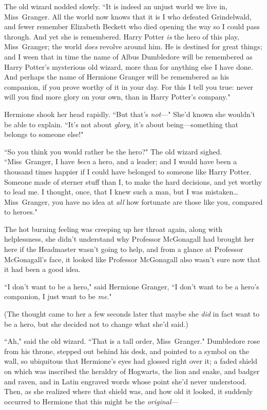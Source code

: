 The old wizard nodded slowly. ``It is indeed an unjust world we live in, Miss~Granger. All the world now knows that it is I who defeated Grindelwald, and fewer remember Elizabeth Beckett who died opening the way so I could pass through. And yet she is remembered. Harry Potter \emph{is} the hero of this play, Miss~Granger; the world \emph{does} revolve around him. He is destined for great things; and I ween that in time the name of Albus Dumbledore will be remembered as Harry Potter's mysterious old wizard, more than for anything else I have done. And perhaps the name of Hermione Granger will be remembered as his companion, if you prove worthy of it in your day. For this I tell you true: never will you find more glory on your own, than in Harry Potter's company."

Hermione shook her head rapidly. ``But that's \emph{not}—" She'd known she wouldn't be able to explain. ``It's not about \emph{glory}, it's about being—something that belongs to someone else!"

``So you think you would rather be the hero?" The old wizard sighed. ``Miss~Granger, I have \emph{been} a hero, and a leader; and I would have been a thousand times happier if I could have belonged to someone like Harry Potter. Someone made of sterner stuff than I, to make the hard decisions, and yet worthy to lead me. I thought, once, that I knew such a man, but I was mistaken{\ldots} Miss~Granger, you have no idea at \emph{all} how fortunate are those like you, compared to heroes."

The hot burning feeling was creeping up her throat again, along with helplessness, she didn't understand why Professor McGonagall had brought her here if the Headmaster wasn't going to help, and from a glance at Professor McGonagall's face, it looked like Professor McGonagall also wasn't sure now that it had been a good idea.

``I don't want to be a hero," said Hermione Granger, ``I don't want to be a hero's companion, I just want to be \emph{me}."

(The thought came to her a few seconds later that maybe she \emph{did} in fact want to be a hero, but she decided not to change what she'd said.)

``Ah," said the old wizard. ``That is a tall order, Miss~Granger." Dumbledore rose from his throne, stepped out behind his desk, and pointed to a symbol on the wall, so ubiquitous that Hermione's eyes had glossed right over it; a faded shield on which was inscribed the heraldry of Hogwarts, the lion and snake, and badger and raven, and in Latin engraved words whose point she'd never understood. Then, as she realized where that shield was, and how old it looked, it suddenly occurred to Hermione that this might be the \emph{original}—

